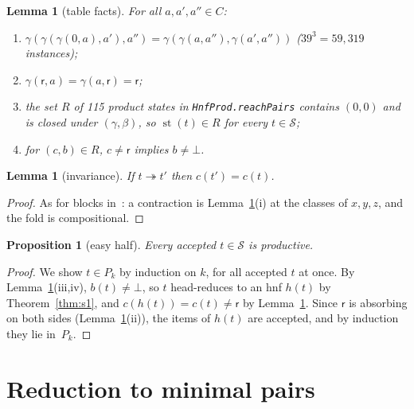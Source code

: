 \documentclass[11pt]{amsart}
\newtheorem{lemma}[theorem]{Lemma}
\newtheorem{proposition}[theorem]{Proposition}
\theoremstyle{definition}
\theoremstyle{remark}
\newcommand{\lean}[1]{\texttt{#1}}
\newcommand{\rej}{\mathsf{r}}
\newcommand{\st}{\operatorname{st}}
\begin{document}
\begin{lemma}[table facts]\label{lem:table}
For all $a,a',a''\in C$:
\begin{enumerate}
\item[(i)] $\gamma(\gamma(\gamma(0,a),a'),a'')=\gamma(\gamma(a,a''),\gamma(a',a''))$
  \textup{($39^3=59{,}319$ instances)};
\item[(ii)] $\gamma(\rej,a)=\gamma(a,\rej)=\rej$;
\item[(iii)] the set $R$ of 115 product states in \lean{HnfProd.reachPairs} contains $(0,0)$
  and is closed under $(\gamma,\beta)$, so $\st(t)\in R$ for every $t\in\mathcal S$;
\item[(iv)] for $(c,b)\in R$, $c\ne\rej$ implies $b\ne\bot$.
\end{enumerate}
\end{lemma}

\begin{lemma}[invariance]\label{lem:invc}
If $t\twoheadrightarrow t'$ then $c(t')=c(t)$.
\end{lemma}
\begin{proof}
As for blocks in~\citep{s1}: a contraction is Lemma~\ref{lem:table}(i) at the classes of
$x,y,z$, and the fold is compositional.
\end{proof}

\begin{proposition}[easy half]\label{prop:easy}
Every accepted $t\in\mathcal S$ is productive.
\end{proposition}
\begin{proof}
We show $t\in P_k$ by induction on $k$, for all accepted $t$ at once. By
Lemma~\ref{lem:table}(iii,iv), $b(t)\ne\bot$, so $t$ head-reduces to an hnf $h(t)$ by
Theorem~\ref{thm:s1}, and $c(h(t))=c(t)\ne\rej$ by Lemma~\ref{lem:invc}. Since $\rej$ is
absorbing on both sides (Lemma~\ref{lem:table}(ii)), the items of $h(t)$ are accepted, and
by induction they lie in~$P_k$.
\end{proof}

\section{Reduction to minimal pairs}\label{sec:reduce}
\end{document}
